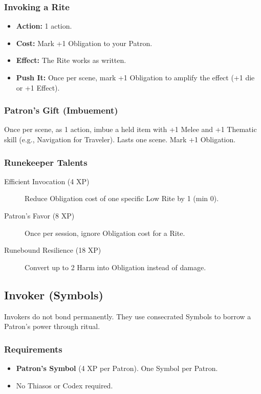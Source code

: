 \subsubsection*{Invoking a Rite}
\label{sec:invoking-rite}
\begin{itemize}
  \item \textbf{Action:} 1 action.
  \item \textbf{Cost:} Mark +1 Obligation to your Patron.
  \item \textbf{Effect:} The Rite works as written.
  \item \textbf{Push It:} Once per scene, mark +1 Obligation to amplify the effect (+1 die or +1 Effect).
\end{itemize}

\subsubsection*{Patron’s Gift (Imbuement)}
\label{sec:patrons-gift}
Once per scene, as 1 action, imbue a held item with +1 Melee and +1 Thematic skill (e.g., Navigation for Traveler). Lasts one scene. Mark +1 Obligation.

\subsubsection*{Runekeeper Talents}
\label{sec:runekeeper-talents}
\begin{description}
  \item[Efficient Invocation (4 XP)] Reduce Obligation cost of one specific Low Rite by 1 (min 0).
  \item[Patron’s Favor (8 XP)] Once per session, ignore Obligation cost for a Rite.
  \item[Runebound Resilience (18 XP)] Convert up to 2 Harm into Obligation instead of damage.
\end{description}

\subsection{Invoker (Symbols)}
\label{sec:invoker}

Invokers do not bond permanently. They use consecrated Symbols to borrow a Patron’s power through ritual.

\subsubsection*{Requirements}
\begin{itemize}
  \item \textbf{Patron’s Symbol} (4 XP per Patron). One Symbol per Patron.
  \item No Thiasos or Codex required.
\end{itemize}

